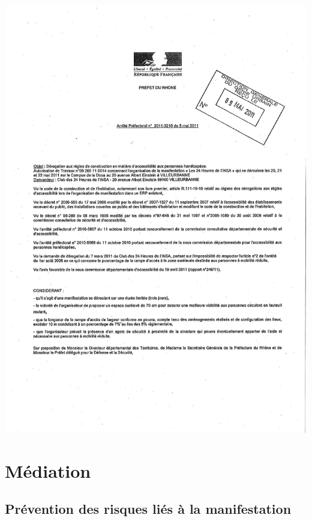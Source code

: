 \documentclass[hidelinks, paper=a4, fontsize=13pt]{report}
\begin{document}
\begin{center}
\includegraphics[scale=0.7]{Annexes/Documents/arretePrefPMR}
\end{center}



\chapter{Médiation}
\section{Prévention des risques liés à la manifestation}
\end{document}
